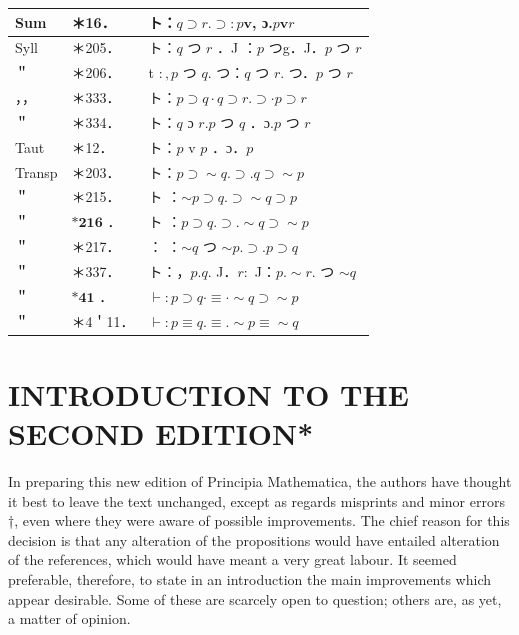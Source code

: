 \documentclass[10pt]{article}
\begin{document}
\begin{table}[h]
\begin{center}
\begin{tabular}{|l|l|l|}
\hline
Sum & ＊16． & ト：$q \supset r . \supset: p \mathbf{v}$, ɔ.$p \mathbf{v} r$ \\
\hline
Syll & ＊205． & ト：$q$ つ $r$ ．J ：$p$ つg．J．$p$ つ $r$ \\
\hline
＂ & ＊206． & t $:, p$ つ $q$. つ：$q$ つ $r$. つ．$p$ つ $r$ \\
\hline
，， & ＊333． & ト：$p \supset q \cdot q \supset r . \supset \cdot p \supset r$ \\
\hline
＂ & ＊334． & ト：$q$ ɔ $r . p$ つ $q$ ．ɔ.$p$ つ $r$ \\
\hline
Taut & ＊12． & ト：$p$ v $p$ ．ɔ．$p$ \\
\hline
Transp & ＊203． & ト：$p \supset \sim q . \supset . q \supset \sim p$ \\
\hline
＂ & ＊215． & ト ：$\sim p \supset q . \supset \sim q \supset p$ \\
\hline
＂ & $\boldsymbol{*} \mathbf{2 1 6}$ ． & ト ：$p \supset q . \supset . \sim q \supset \sim p$ \\
\hline
＂ & ＊217． & ： ：$\sim q$ つ $\sim p . \supset . p \supset q$ \\
\hline
＂ & ＊337． & ト：，$p . q$. J．$r:$ J：$p . \sim r$. つ $\sim q$ \\
\hline
＂ & $\boldsymbol{*} \mathbf{4} \boldsymbol{1}$ ． & $\vdash: p \supset q \cdot \equiv \cdot \sim q \supset \sim p$ \\
\hline
＂ & ＊4＇11． & $\vdash: p \equiv q . \equiv . \sim p \equiv \sim q$ \\
\hline
\end{tabular}
\end{center}
\end{table}

\section*{INTRODUCTION TO THE SECOND EDITION*}
In preparing this new edition of Principia Mathematica, the authors have thought it best to leave the text unchanged, except as regards misprints and minor errors †, even where they were aware of possible improvements. The chief reason for this decision is that any alteration of the propositions would have entailed alteration of the references, which would have meant a very great labour. It seemed preferable, therefore, to state in an introduction the main improvements which appear desirable. Some of these are scarcely open to question; others are, as yet, a matter of opinion.
\end{document}
